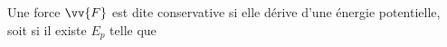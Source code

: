 ﻿\documentclass[a4paper]{article}
\begin{document}
\pagestyle{fancy}
\fancyhf{}
\setlength{\headheight}{15pt}

\begin{center}
	\large{}
\end{center}


Une force \(\vv{F}\) est dite conservative si elle dérive d'une énergie potentielle, soit si il existe \(E_p\) telle que 
\end{document}
